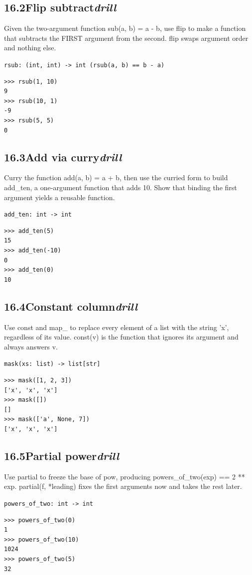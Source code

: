 \documentclass[10pt,letterpaper]{book}
\begin{document}
\subsection*{16.2\quad Flip subtract\hfill\textnormal{\textit{drill}}}
Given the two-argument function sub(a, b) = a - b, use flip to make a function that subtracts the FIRST argument from the second. flip swaps argument order and nothing else.

\noindent\texttt{rsub: (int, int) -> int   (rsub(a, b) == b - a)}
\begin{lstlisting}[style=ex]
>>> rsub(1, 10)
9
>>> rsub(10, 1)
-9
>>> rsub(5, 5)
0
\end{lstlisting}
\subsection*{16.3\quad Add via curry\hfill\textnormal{\textit{drill}}}
Curry the function add(a, b) = a + b, then use the curried form to build add\_ten, a one-argument function that adds 10. Show that binding the first argument yields a reusable function.

\noindent\texttt{add\_ten: int -> int}
\begin{lstlisting}[style=ex]
>>> add_ten(5)
15
>>> add_ten(-10)
0
>>> add_ten(0)
10
\end{lstlisting}
\subsection*{16.4\quad Constant column\hfill\textnormal{\textit{drill}}}
Use const and map\_ to replace every element of a list with the string 'x', regardless of its value. const(v) is the function that ignores its argument and always answers v.

\noindent\texttt{mask(xs: list) -> list[str]}
\begin{lstlisting}[style=ex]
>>> mask([1, 2, 3])
['x', 'x', 'x']
>>> mask([])
[]
>>> mask(['a', None, 7])
['x', 'x', 'x']
\end{lstlisting}
\subsection*{16.5\quad Partial power\hfill\textnormal{\textit{drill}}}
Use partial to freeze the base of pow, producing powers\_of\_two(exp) == 2 ** exp. partial(f, *leading) fixes the first arguments now and takes the rest later.

\noindent\texttt{powers\_of\_two: int -> int}
\begin{lstlisting}[style=ex]
>>> powers_of_two(0)
1
>>> powers_of_two(10)
1024
>>> powers_of_two(5)
32
\end{lstlisting}
\end{document}
